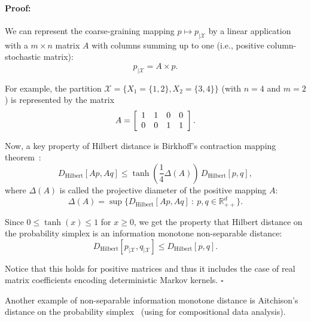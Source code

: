 \documentclass{article}
\newenvironment{proof}{\paragraph{Proof:}}{\hfill$\square$}
\def\bbR{\mathbb{R}}
\def\bbR{\mathbb{R}}
\def\calX{\mathcal{X}}
\def\Hilbert{\mathrm{Hilbert}}
\begin{document}
\begin{proof}
We can represent the coarse-graining mapping $p\mapsto p_{|\calX}$ by a linear application with a $m\times n$ matrix $A$ with columns  summing  up to one (i.e., positive column-stochastic matrix):
$$
p_{|\calX} = A \times p.
$$

For example, the partition $\calX=\{X_1=\{1,2\},X_2=\{3,4\}\}$ (with $n=4$ and $m=2$) is represented by the matrix
$$
A=\left[\begin{array}{llll}1&1&0&0\cr 0&0&1&1\end{array}\right].
$$

Now, a key property of Hilbert distance is Birkhoff's contraction mapping theorem~\cite{birkhoff1957extensions,bushell1973projective}:
$$
D_\Hilbert[Ap,Aq]\leq \tanh\left(\frac{1}{4}\Delta(A)\right)\, D_\Hilbert[p,q],
$$
where $\Delta(A)$ is called the projective diameter of the positive mapping $A$:
$$
\Delta(A)=\sup\{D_\Hilbert[Ap,Aq]\ :\ p,q\in\bbR_{++}^d\}.
$$


Since $0\leq \tanh(x)\leq 1$ for $x\geq 0$, we get the property that  Hilbert distance on the probability simplex is an information monotone non-separable distance:
$$
D_\Hilbert[p_{|\calX},q_{|\calX}]\leq D_\Hilbert[p,q].
$$

Notice that this holds for positive matrices and thus it includes the case of real matrix coefficients encoding deterministic Markov kernels.
\end{proof}

Another example of non-separable information monotone distance is Aitchison's distance on the probability simplex~\cite{erb2021information} (using for compositional data analysis).



\end{document}
